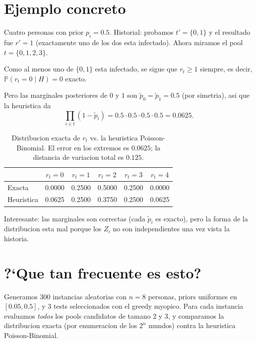 \documentclass[11pt]{article}
\begin{document}
\section{Ejemplo concreto}

Cuatro personas con prior $p_i = 0.5$. Historial: probamos $t' = \{0,1\}$
y el resultado fue $r' = 1$ (exactamente uno de los dos esta infectado).
Ahora miramos el pool $t = \{0,1,2,3\}$.

Como al menos uno de $\{0,1\}$ esta infectado, se sigue que $r_t \ge 1$
siempre, es decir, $\mathbb{P}(r_t = 0 \mid H) = 0$ exacto.

Pero las marginales posteriores de $0$ y $1$ son $\tilde p_0 = \tilde p_1 = 0.5$
(por simetria), asi que la heuristica da
\[
\prod_{i \in t}(1 - \tilde p_i) = 0.5 \cdot 0.5 \cdot 0.5 \cdot 0.5 = 0.0625.
\]

\begin{table}[h]
\centering
\begin{tabular}{lccccc}
\toprule
 & $r_t=0$ & $r_t=1$ & $r_t=2$ & $r_t=3$ & $r_t=4$ \\
\midrule
Exacta      & 0.0000 & 0.2500 & 0.5000 & 0.2500 & 0.0000 \\
Heuristica  & 0.0625 & 0.2500 & 0.3750 & 0.2500 & 0.0625 \\
\bottomrule
\end{tabular}
\caption{Distribucion exacta de $r_t$ vs. la heuristica Poisson-Binomial.
El error en los extremos es $0.0625$; la distancia de variacion total es $0.125$.}
\end{table}

Interesante: las marginales son correctas (cada $\tilde p_i$ es exacto),
pero la forma de la distribucion esta mal porque los $Z_i$ no son
independientes una vez vista la historia.

\section{?`Que tan frecuente es esto?}

Generamos 300 instancias aleatorias con $n = 8$ personas, priors
uniformes en $[0.05, 0.5]$, y 3 tests seleccionados con el greedy
myopico. Para cada instancia evaluamos \emph{todos} los pools
candidatos de tamano 2 y 3, y comparamos la distribucion exacta
(por enumeracion de los $2^n$ mundos) contra la heuristica
Poisson-Binomial.
\end{document}
